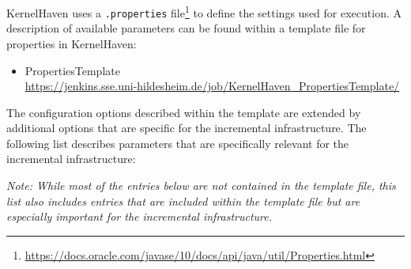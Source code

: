\documentclass[a4paper]{article}
\begin{document}
KernelHaven uses a \texttt{.properties} file\footnote{\url{https://docs.oracle.com/javase/10/docs/api/java/util/Properties.html}} to define the settings used for execution. A description of available parameters can be found within a template file for properties in KernelHaven:
\begin{sloppypar}
	\begin{itemize}
	\item PropertiesTemplate \\
	  \url{https://jenkins.sse.uni-hildesheim.de/job/KernelHaven\_PropertiesTemplate/}
	\end{itemize}
\end{sloppypar}

The configuration options described within the template are extended by additional options that are specific for the incremental infrastructure. The following list describes parameters that are specifically relevant for the incremental infrastructure:

\emph{Note: While most of the entries below are not contained in the template file, this list also includes entries that are included within the template file but are especially important for the incremental infrastructure.}
\end{document}
